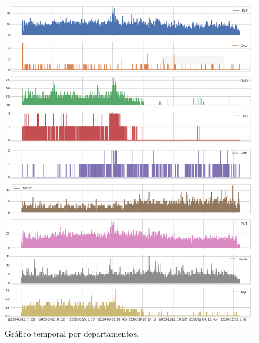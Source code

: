 \documentclass[a4paper,12pt]{article}
\begin{document}
		\begin{figure}[H]
			\begin{center}
				\includegraphics[width=1\textwidth]{multi_dpto.png}
				\caption{Gráfico temporal por departamentos.}
				\label{fig:graf_mult_dpto}
			\end{center}
		\end{figure}
				
\end{document}
